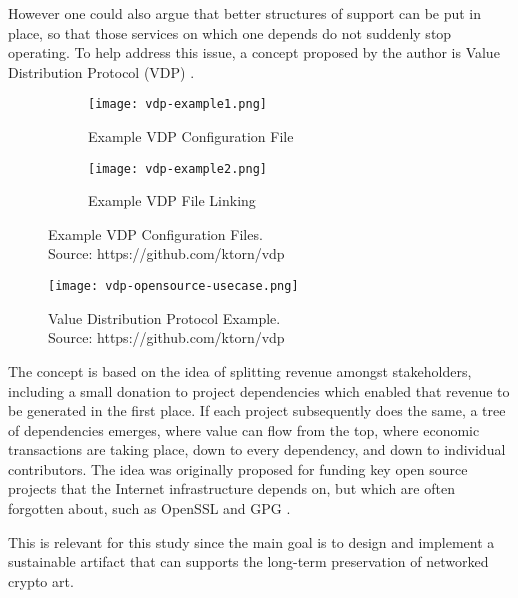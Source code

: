 However one could also argue that better structures of support can be put in place, so that those services on which one depends do not suddenly stop operating. To help address this issue, a concept proposed by the author is Value Distribution Protocol (VDP) \cite{HackcoinHongKong2015} \cite{farinhaGrokyaPrivacyFriendlyFramework2016}.


\begin{figure}[H]
  \centering
  \captionsetup{justification=centering}
  \begin{subfigure}[b]{0.45\textwidth}
    \centering
    \texttt{[image: vdp-example1.png]}
    \caption{Example VDP Configuration File}
    \label{fig:vdp1}
  \end{subfigure}
  \hfill
  \begin{subfigure}[b]{0.45\textwidth}
    \centering
    \texttt{[image: vdp-example2.png]}
    \caption{Example VDP File Linking}
    \label{fig:vdp2}
  \end{subfigure}
  \caption{Example VDP Configuration Files. \\ Source: https://github.com/ktorn/vdp}
  \label{fig:vdp-examples}
\end{figure}


\begin{figure}[h]
    \centering
    \captionsetup{justification=centering}
    \texttt{[image: vdp-opensource-usecase.png]}
    \captionsetup{justification=centering}
    \caption[Value Distribution Protocol]{Value Distribution Protocol Example. \\ Source: https://github.com/ktorn/vdp}
    \label{fig:vdp}
\end{figure}

The concept is based on the idea of splitting revenue amongst stakeholders, including a small donation to project dependencies which enabled that revenue to be generated in the first place. If each project subsequently does the same, a tree of dependencies emerges, where value can flow from the top, where economic transactions are taking place, down to every dependency, and down to individual contributors. The idea was originally proposed for funding key open source projects that the Internet infrastructure depends on, but which are often forgotten about, such as OpenSSL and GPG \cite{oberhausInternetWasBuilt2019}.

This is relevant for this study since the main goal is to design and implement a sustainable artifact that can supports the long-term preservation of networked crypto art.

